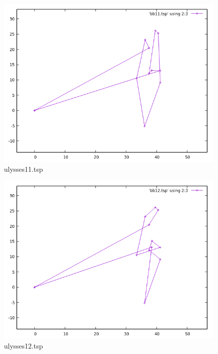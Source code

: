 \documentclass[12pt,spanish]{article}
\begin{document}
\begin{figure}[H]
\centering
\includegraphics[scale=0.75]{bb11.png}
\caption{ulysses11.tsp}
\end{figure}

\begin{figure}[H]
\centering
\includegraphics[scale=0.75]{bb12.png}
\caption{ulysses12.tsp}
\end{figure}
\end{document}
